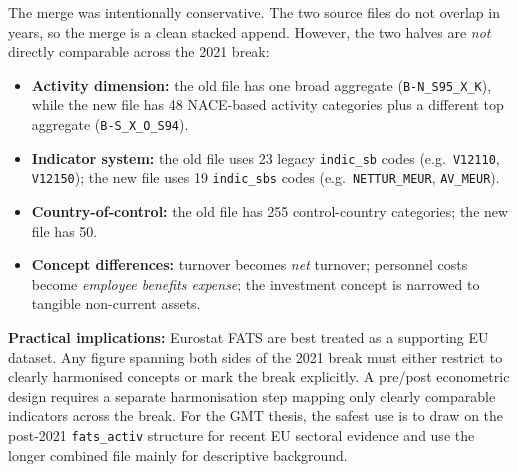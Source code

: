\documentclass[11pt,a4paper]{article}
\begin{document}
The merge was intentionally conservative.  The two source files do not overlap in years, so the merge is a clean stacked append.  However, the two halves are \emph{not} directly comparable across the 2021 break:

\begin{itemize}[noitemsep]
    \item \textbf{Activity dimension:} the old file has one broad aggregate
    (\texttt{B-N\_S95\_X\_K}), while the new file has 48 NACE-based activity
    categories plus a different top aggregate (\texttt{B-S\_X\_O\_S94}).
    \item \textbf{Indicator system:} the old file uses 23 legacy
    \texttt{indic\_sb} codes (e.g.\ \texttt{V12110}, \texttt{V12150}); the new
    file uses 19 \texttt{indic\_sbs} codes (e.g.\ \texttt{NETTUR\_MEUR},
    \texttt{AV\_MEUR}).
    \item \textbf{Country-of-control:} the old file has 255 control-country
    categories; the new file has 50.
    \item \textbf{Concept differences:} turnover becomes \emph{net} turnover;
    personnel costs become \emph{employee benefits expense}; the investment
    concept is narrowed to tangible non-current assets.
\end{itemize}

\noindent\textbf{Practical implications:} Eurostat FATS are best treated as a
supporting EU dataset.  Any figure spanning both sides of the 2021 break must
either restrict to clearly harmonised concepts or mark the break explicitly.  A
pre/post econometric design requires a separate harmonisation step mapping only
clearly comparable indicators across the break.  For the GMT thesis, the safest
use is to draw on the post-2021 \texttt{fats\_activ} structure for recent EU
sectoral evidence and use the longer combined file mainly for descriptive
background.


\newpage
\printbibliography %
\end{document}
